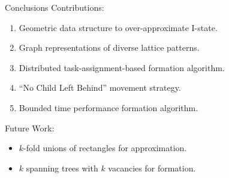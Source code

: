 \begin{frame}{Conclusions}
  Contributions:
  \begin{enumerate}
  \item Geometric data structure to over-approximate I-state.
  \item Graph representations of diverse lattice patterns.
  \item Distributed task-assignment-based formation algorithm.
  \item ``No Child Left Behind'' movement strategy.
  \item Bounded time performance formation algorithm.
  \end{enumerate}
  Future Work:
  \begin{itemize}
  \item $k$-fold unions of rectangles for approximation.
  \item $k$ spanning trees with $k$ vacancies for formation.
  \end{itemize}
\end{frame}